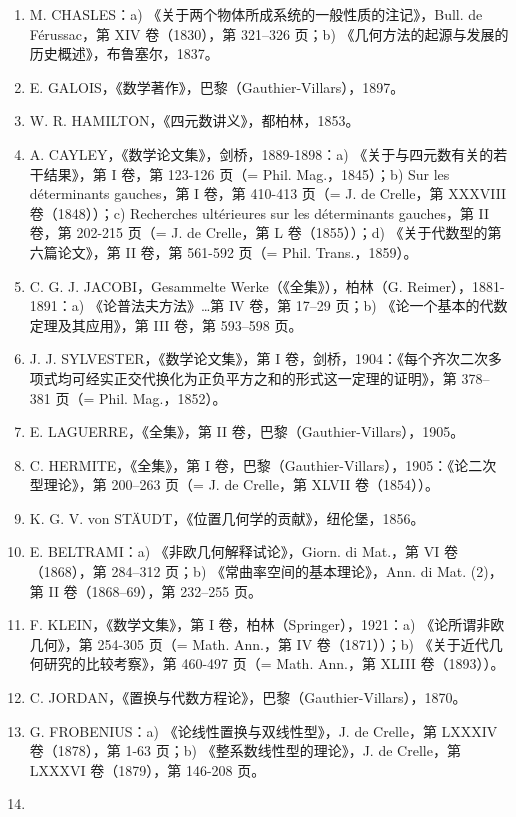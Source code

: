 \begin{enumerate}
\item
  M. CHASLES：a) 《关于两个物体所成系统的一般性质的注记》，Bull. de Férussac，第 XIV 卷（1830），第 321–326 页；b) 《几何方法的起源与发展的历史概述》，布鲁塞尔，1837。
\item
  E. GALOIS，《数学著作》，巴黎（Gauthier-Villars），1897。
\item
  W. R. HAMILTON，《四元数讲义》，都柏林，1853。
\item
  A. CAYLEY，《数学论文集》，剑桥，1889-1898：a) 《关于与四元数有关的若干结果》，第 I 卷，第 123-126 页（= Phil. Mag.，1845）；b) Sur les déterminants gauches，第 I 卷，第 410-413 页（= J. de Crelle，第 XXXVIII 卷（1848））；c) Recherches ultérieures sur les déterminants gauches，第 II 卷，第 202-215 页（= J. de Crelle，第 L 卷（1855））；d) 《关于代数型的第六篇论文》，第 II 卷，第 561-592 页（= Phil. Trans.，1859）。
\item
  C. G. J. JACOBI，Gesammelte Werke（《全集》），柏林（G. Reimer），1881-1891：a) 《论普法夫方法》\ldots 第 IV 卷，第 17–29 页；b) 《论一个基本的代数定理及其应用》，第 III 卷，第 593–598 页。
\item
  J. J. SYLVESTER，《数学论文集》，第 I 卷，剑桥，1904：《每个齐次二次多项式均可经实正交代换化为正负平方之和的形式这一定理的证明》，第 378–381 页（= Phil. Mag.，1852）。
\item
  E. LAGUERRE，《全集》，第 II 卷，巴黎（Gauthier-Villars），1905。
\item
  C. HERMITE，《全集》，第 I 卷，巴黎（Gauthier-Villars），1905：《论二次型理论》，第 200–263 页（= J. de Crelle，第 XLVII 卷（1854））。
\item
  K. G. V. von STÄUDT，《位置几何学的贡献》，纽伦堡，1856。
\item
  E. BELTRAMI：a) 《非欧几何解释试论》，Giorn. di Mat.，第 VI 卷（1868），第 284–312 页；b) 《常曲率空间的基本理论》，Ann. di Mat. (2)，第 II 卷（1868–69），第 232–255 页。
\item
  F. KLEIN，《数学文集》，第 I 卷，柏林（Springer），1921：a) 《论所谓非欧几何》，第 254-305 页（= Math. Ann.，第 IV 卷（1871））；b) 《关于近代几何研究的比较考察》，第 460-497 页（= Math. Ann.，第 XLIII 卷（1893））。
\item
  C. JORDAN，《置换与代数方程论》，巴黎（Gauthier-Villars），1870。
\item
  G. FROBENIUS：a) 《论线性置换与双线性型》，J. de Crelle，第 LXXXIV 卷（1878），第 1-63 页；b) 《整系数线性型的理论》，J. de Crelle，第 LXXXVI 卷（1879），第 146-208 页。
\item

\end{enumerate}
